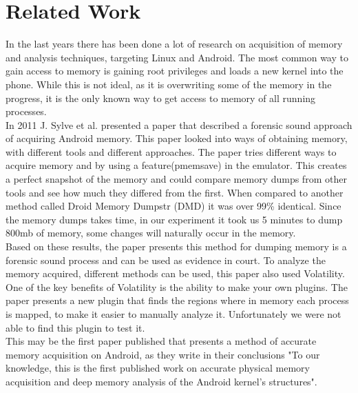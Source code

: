 \section{Related Work}
In the last years there has been done a lot of research on acquisition of memory
and analysis techniques, targeting Linux and Android. The most common way to 
gain access to memory is gaining root privileges and loads a new kernel into the 
phone. While this is not ideal, as it is overwriting some of the memory in the 
progress, it is the only known way to get access to memory of all running processes.\\

In 2011 J. Sylve et al. presented a paper that described a forensic sound 
approach of acquiring Android memory. \cite{acq_vol_android_mem} This paper looked 
into ways of obtaining memory, with different tools and different approaches. The paper 
tries different ways to acquire memory and by using a feature(pmemsave) in the emulator. 
This creates a perfect snapshot of the memory and could compare memory dumps from other 
tools and see how much they differed from the first. When compared to another method 
called Droid Memory Dumpstr (DMD) it was over 99\% identical. Since the memory dumps 
takes time, in our experiment it took us 5 minutes to dump 800mb of memory, some 
changes will naturally occur in the memory.\\

Based on these results, the paper presents this method for dumping memory is a 
forensic sound process and can be used as evidence in court. To analyze the memory 
acquired, different methods can be used, this paper also used Volatility.
One of the key benefits of Volatility is the ability to make your 
own plugins. The paper presents a new plugin that finds the regions where in memory 
each process is mapped, to make it easier to manually analyze it. Unfortunately we were not 
able to find this plugin to test it.\\

This may be the first paper published that presents a method of accurate memory acquisition on
Android, as they write in their conclusions "To our knowledge, this is the first published work on
accurate physical memory acquisition and deep memory analysis of the Android kernel's structures".
